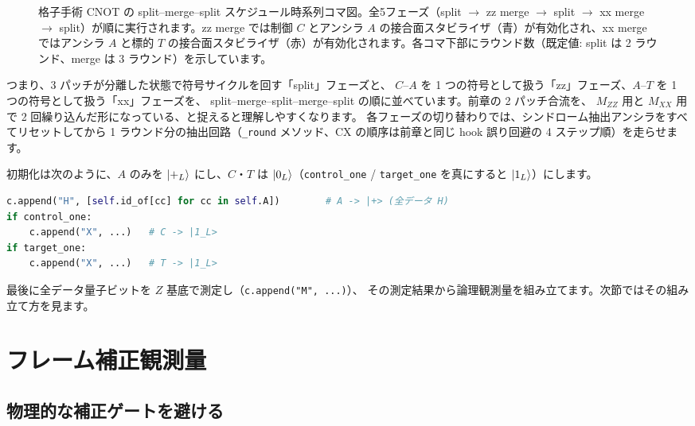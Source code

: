 \begin{figure}[htbp]
  \caption{格子手術 CNOT の split–merge–split スケジュール時系列コマ図。全5フェーズ（split $\to$ zz merge $\to$ split $\to$ xx merge $\to$ split）が順に実行されます。zz merge では制御 $C$ とアンシラ $A$ の接合面スタビライザ（青）が有効化され、xx merge ではアンシラ $A$ と標的 $T$ の接合面スタビライザ（赤）が有効化されます。各コマ下部にラウンド数（既定値: split は 2 ラウンド、merge は 3 ラウンド）を示しています。}
  \label{fig:ch16_ls_cnot_schedule}
\end{figure}

つまり、3 パッチが分離した状態で符号サイクルを回す「split」フェーズと、
$C$–$A$ を 1 つの符号として扱う「zz」フェーズ、$A$–$T$ を 1 つの符号として扱う「xx」フェーズを、
split–merge–split–merge–split の順に並べています。前章の 2 パッチ合流を、
$M_{ZZ}$ 用と $M_{XX}$ 用で 2 回繰り込んだ形になっている、と捉えると理解しやすくなります。
各フェーズの切り替わりでは、シンドローム抽出アンシラをすべてリセットしてから
1 ラウンド分の抽出回路（\texttt{\_round} メソッド、CX の順序は前章と同じ hook 誤り回避の
4 ステップ順）を走らせます。

初期化は次のように、$A$ のみを $\ket{+_L}$ にし、$C$・$T$ は $\ket{0_L}$（\texttt{control\_one} /
\texttt{target\_one} を真にすると $\ket{1_L}$）にします。

\begin{lstlisting}[language=Python, caption={src/stages/02\_circuit\_level/src/ftqc/ls\_cnot\_ft.py の初期化}]
c.append("H", [self.id_of[cc] for cc in self.A])        # A -> |+> (全データ H)
if control_one:
    c.append("X", ...)   # C -> |1_L>
if target_one:
    c.append("X", ...)   # T -> |1_L>
\end{lstlisting}

最後に全データ量子ビットを $Z$ 基底で測定し（\texttt{c.append("M", ...)}）、
その測定結果から論理観測量を組み立てます。次節ではその組み立て方を見ます。

\section{フレーム補正観測量}\label{sec:frame_obs}

\subsection{物理的な補正ゲートを避ける}


